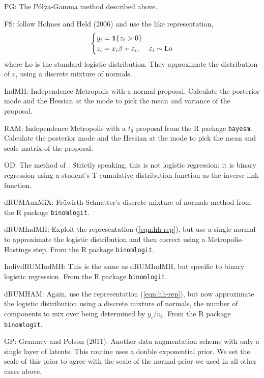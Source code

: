 \documentclass{article}
\newcommand{\one}{\bold{1}}
\newcommand{\ep}{\varepsilon}
\newcommand{\Polya}{P\'{o}lya}
\begin{document}
\begin{outline}

\1 PG: The \Polya-Gamma method described above.

\1 FS: \cite{fruhwirth-schnatter-fruhwirth-2010} follow Holmes and Held (2006)
and use the \cite{albert-chib-1993} like representation,
\begin{equation}
\label{eqn:hh-rep}
\begin{cases}
y_i = \one \{ z_i > 0 \} \\
z_i = x_i \beta + \ep_i, & \ep_i \sim \text{Lo}
\end{cases}
\end{equation}
where $\text{Lo}$ is the standard logistic distribution.  They approximate the
distribution of $\ep_i$ using a discrete mixture of normals.

\1 IndMH: Independence Metropolis with a normal proposal.  Calculate the
posterior mode and the Hessian at the mode to pick the mean and variance of the
proposal.

\1 RAM: Independence Metropolis with a $t_6$ proposal from the R package
\texttt{bayesm}.  Calculate the posterior mode and the Hessian at the mode to
pick the mean and scale matrix of the proposal.

\1 OD: The method of \cite{obrien-dunson-2004}.  Strictly speaking, this is not
logistic regression; it is binary regression using a student's T cumulative
distribution function as the inverse link function.

\1 dRUMAuxMiX: Fr\"{u}wirth-Schnatter's discrete mixture of normals method from
the R package \texttt{binomlogit}.

\1 dRUMIndMH: Exploit the representation (\ref{eqn:hh-rep}), but use a single
normal to approximate the logistic distribution and then correct using a
Metropolis-Hastings step.  From the R package \texttt{binomlogit}.

\1 IndivdRUMIndMH: This is the same as dRUMIndMH, but specific to binary
logistic regression.  From the R package \texttt{binomlogit}.

\1 dRUMHAM: Again, use the representation (\ref{eqn:hh-rep}), but now
approximate the logistic distribution using a discrete mixture of normals, the
number of components to mix over being determined by $y_i / n_i$.  From the R
package \texttt{binomlogit}.

\1 GP: Gramacy and Polson (2011).  Another data augmentation scheme with only a
single layer of latents.  This routine uses a double exponential prior.  We set
the scale of this prior to agree with the scale of the normal prior we used in
all other cases above.

\end{outline}
\end{document}
